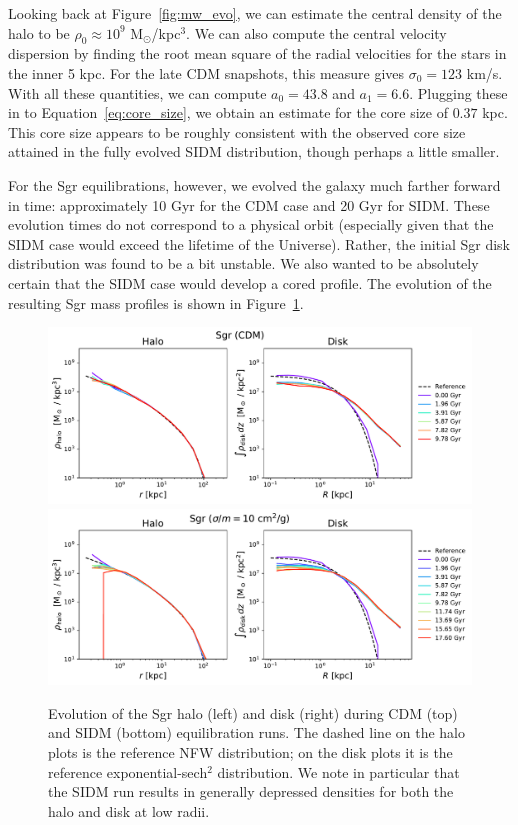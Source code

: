 Looking back at Figure~\ref{fig:mw_evo}, we can estimate the central density
of the halo to be $\rho_0 \approx 10^9$ M$_\odot$/kpc$^3$. We can also compute
the central velocity dispersion by finding the root mean square of the radial
velocities for the stars in the inner 5 kpc. For the late CDM snapshots, this
measure gives $\sigma_0 = 123$ km/s.  With all these quantities, we can
compute $a_0 = 43.8$ and $a_1 = 6.6$. Plugging these in to
Equation~\ref{eq:core_size}, we obtain an estimate for the core size of $0.37$
kpc. This core size appears to be roughly consistent with the observed core
size attained in the fully evolved SIDM distribution, though perhaps a little
smaller.

For the Sgr equilibrations, however, we evolved the galaxy much farther
forward in time: approximately 10 Gyr for the CDM case and 20 Gyr for SIDM.
These evolution times do not correspond to a physical orbit (especially given
that the SIDM case would exceed the lifetime of the Universe).  Rather, the
initial Sgr disk distribution was found to be a bit unstable.  We also wanted
to be absolutely certain that the SIDM case would develop a cored profile.
The evolution of the resulting Sgr mass profiles is shown in
Figure~\ref{fig:sgr_evo}.

\begin{figure}
    \centering
    \includegraphics[width=0.9\linewidth]{figs/sgr_evolution_cdm.pdf}
    \includegraphics[width=0.9\linewidth]{figs/sgr_evolution_sidm.pdf}
    \caption{%
        Evolution of the Sgr halo (left) and disk (right) during CDM (top) and
        SIDM (bottom) equilibration runs.  The dashed line on the halo plots
        is the reference NFW distribution; on the disk plots it is the
        reference exponential-sech$^2$ distribution.  We note in particular
        that the SIDM run results in generally depressed densities for both
        the halo and disk at low radii.
    }
    \label{fig:sgr_evo}
\end{figure}

